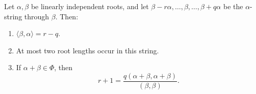 Let $\alpha, \beta$ be linearly independent roots, and let $\beta - r\alpha, \ldots, \beta, \ldots, \beta + q\alpha$ be the $\alpha$-string through $\beta$. Then:

\begin{enumerate}
\item[(a)] $\langle \beta, \alpha \rangle = r - q$.

\item[(b)] At most two root lengths occur in this string.

\item[(c)] If $\alpha + \beta \in \Phi$, then
$$r + 1 = \frac{q(\alpha + \beta, \alpha + \beta)}{(\beta, \beta)}.$$
\end{enumerate}
